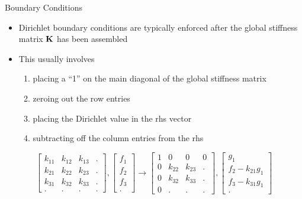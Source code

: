 \begin{frame}{Boundary Conditions}
  \begin{itemize}
  \item Dirichlet boundary conditions are typically enforced after
    the global stiffness matrix $\bf{K}$ has been assembled
  \item This usually involves
    \begin{enumerate}
    \item placing a ``1'' on the main diagonal of the
      global stiffness matrix
    \item zeroing out the row entries
    \item placing the Dirichlet
      value in the rhs vector
    \item subtracting off the column entries from the rhs
    \end{enumerate}
  \end{itemize}
  \begin{equation}
    \nonumber
      \begin{bmatrix}
	k_{11} & k_{12} & k_{13} & .  \\
	k_{21} & k_{22} & k_{23} & .  \\
	k_{31} & k_{32} & k_{33} & .  \\
	  .    &   .    &    .   & .
      \end{bmatrix},
      \begin{bmatrix}
	f_{1}  \\
	f_{2}  \\
	f_{3}  \\
	  .
      \end{bmatrix} \rightarrow
      \begin{bmatrix}
	1      & 0      & 0      & 0  \\
	0      & k_{22} & k_{23} & .  \\
	0      & k_{32} & k_{33} & .  \\
	  0    &   .    &    .   & .
      \end{bmatrix},
      \begin{bmatrix}
	g_{1}  \\
	f_{2} - k_{21}g_1  \\
	f_{3} - k_{31}g_1  \\
	  .
      \end{bmatrix}
  \end{equation}
\end{frame}


